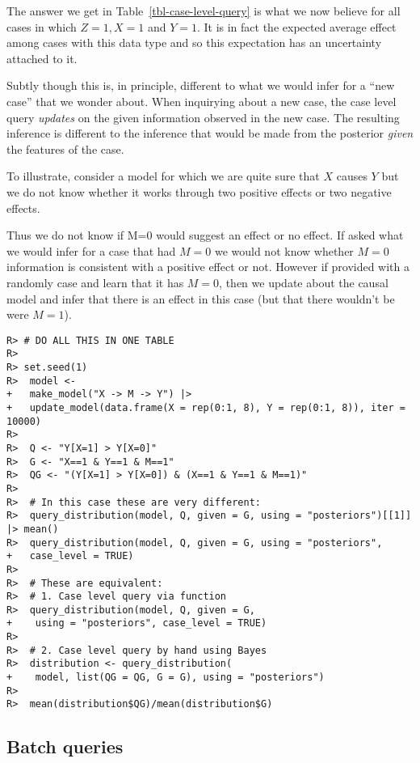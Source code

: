 \documentclass[
  11pt,
  article]{jss}
\begin{document}
The answer we get in Table~\ref{tbl-case-level-query} is what we now
believe for all cases in which \(Z=1, X=1\) and \(Y=1\). It is in fact
the expected average effect among cases with this data type and so this
expectation has an uncertainty attached to it.

Subtly though this is, in principle, different to what we would infer
for a ``new case'' that we wonder about. When inquirying about a new
case, the case level query \emph{updates} on the given information
observed in the new case. The resulting inference is different to the
inference that would be made from the posterior \emph{given} the
features of the case.

To illustrate, consider a model for which we are quite sure that \(X\)
causes \(Y\) but we do not know whether it works through two positive
effects or two negative effects.

Thus we do not know if M=0 would suggest an effect or no effect. If
asked what we would infer for a case that had \(M=0\) we would not know
whether \(M=0\) information is consistent with a positive effect or not.
However if provided with a randomly case and learn that it has \(M=0\),
then we update about the causal model and infer that there is an effect
in this case (but that there wouldn't be were \(M=1\)).

\begin{verbatim}
R> # DO ALL THIS IN ONE TABLE
R> 
R> set.seed(1)
R>  model <-
+   make_model("X -> M -> Y") |>
+   update_model(data.frame(X = rep(0:1, 8), Y = rep(0:1, 8)), iter = 10000)
R> 
R>  Q <- "Y[X=1] > Y[X=0]"
R>  G <- "X==1 & Y==1 & M==1"
R>  QG <- "(Y[X=1] > Y[X=0]) & (X==1 & Y==1 & M==1)"
R> 
R>  # In this case these are very different:
R>  query_distribution(model, Q, given = G, using = "posteriors")[[1]] |> mean()
R>  query_distribution(model, Q, given = G, using = "posteriors",
+   case_level = TRUE)
R> 
R>  # These are equivalent:
R>  # 1. Case level query via function
R>  query_distribution(model, Q, given = G,
+    using = "posteriors", case_level = TRUE)
R> 
R>  # 2. Case level query by hand using Bayes
R>  distribution <- query_distribution(
+    model, list(QG = QG, G = G), using = "posteriors")
R> 
R>  mean(distribution$QG)/mean(distribution$G)
\end{verbatim}

\hypertarget{batch-queries}{%
\subsection{Batch queries}\label{batch-queries}}
\end{document}
